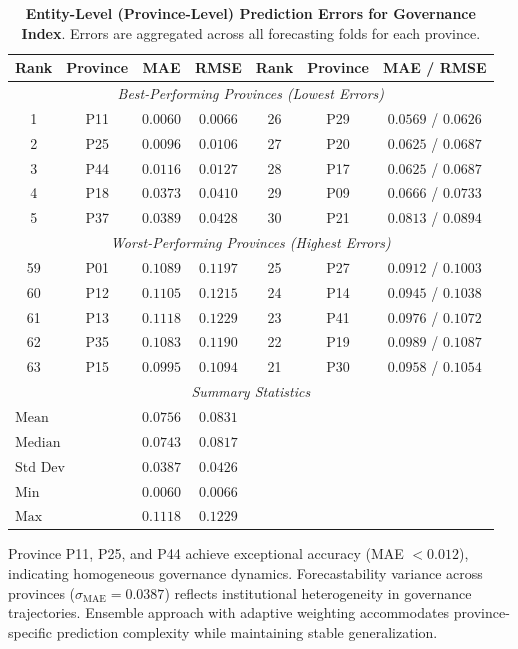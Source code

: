 \documentclass[12pt,a4paper]{article}
\begin{document}
\begin{table}[H]
\centering
\caption{%
    \textbf{Entity-Level (Province-Level) Prediction Errors for Governance Index}.
    Errors are aggregated across all forecasting folds for each province.
}
\label{tab:entity_errors}
\small
\begin{tabular}{ccccccc}
\toprule
\multicolumn{1}{c}{\textbf{Rank}} & \textbf{Province} & \textbf{MAE} & \textbf{RMSE}
    & \multicolumn{1}{c}{\textbf{Rank}} & \textbf{Province} & \textbf{MAE} / \textbf{RMSE} \\
\midrule
\multicolumn{7}{c}{\textit{\small Best-Performing Provinces (Lowest Errors)}} \\
1  & P11 & $0.0060$ & $0.0066$ & 26 & P29 & $0.0569$ / $0.0626$ \\
2  & P25 & $0.0096$ & $0.0106$ & 27 & P20 & $0.0625$ / $0.0687$ \\
3  & P44 & $0.0116$ & $0.0127$ & 28 & P17 & $0.0625$ / $0.0687$ \\
4  & P18 & $0.0373$ & $0.0410$ & 29 & P09 & $0.0666$ / $0.0733$ \\
5  & P37 & $0.0389$ & $0.0428$ & 30 & P21 & $0.0813$ / $0.0894$ \\
\midrule
\multicolumn{7}{c}{\textit{\small Worst-Performing Provinces (Highest Errors)}} \\
59 & P01  & $0.1089$ & $0.1197$ & 25 & P27 & $0.0912$ / $0.1003$ \\
60 & P12  & $0.1105$ & $0.1215$ & 24 & P14 & $0.0945$ / $0.1038$ \\
61 & P13  & $0.1118$ & $0.1229$ & 23 & P41 & $0.0976$ / $0.1072$ \\
62 & P35  & $0.1083$ & $0.1190$ & 22 & P19 & $0.0989$ / $0.1087$ \\
63 & P15  & $0.0995$ & $0.1094$ & 21 & P30 & $0.0958$ / $0.1054$ \\
\midrule
\multicolumn{7}{c}{\textit{\small Summary Statistics}} \\
\multicolumn{2}{l}{$\text{Mean}$}  & $0.0756$ & $0.0831$ \\
\multicolumn{2}{l}{$\text{Median}$}  & $0.0743$ & $0.0817$ \\
\multicolumn{2}{l}{$\text{Std Dev}$}  & $0.0387$ & $0.0426$ \\
\multicolumn{2}{l}{$\text{Min}$}  & $0.0060$ & $0.0066$ \\
\multicolumn{2}{l}{$\text{Max}$}  & $0.1118$ & $0.1229$ \\
\bottomrule
\end{tabular}
\begin{flushleft}
\footnotesize
Province P11, P25, and P44 achieve exceptional accuracy (MAE $< 0.012$), indicating homogeneous governance dynamics.
Forecastability variance across provinces ($\sigma_{\text{MAE}} = 0.0387$) reflects institutional heterogeneity in governance trajectories.
Ensemble approach with adaptive weighting accommodates province-specific prediction complexity while maintaining stable generalization.
\end{flushleft}
\end{table}
\end{document}
